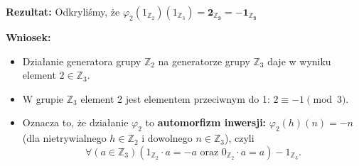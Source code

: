 \begin{goall}
\begin{enumerate}[label=\textbf{Krok \arabic*.}, wide]
\textbf{Rezultat:} Odkryliśmy, że $\varphi_2\left( 1_{\scriptscriptstyle\mathbb{Z}_2} \right)\left( 1_{\scriptscriptstyle\mathbb{Z}_3} \right) = \bm{2_{\scriptscriptstyle\mathbb{Z}_3} = -1_{\scriptscriptstyle\mathbb{Z}_3} } $ 
\end{enumerate}

\textbf{Wniosek:}
\begin{itemize}
	\item Działanie generatora grupy $\mathbb{Z}_2$ na generatorze grupy $\mathbb{Z}_3$ daje w wyniku element $2 \in \mathbb{Z}_3$.
	\item W grupie $\mathbb{Z}_3$ element 2 jest elementem przeciwnym do 1:  $2 \equiv -1 \pmod{3} $.
	\item Oznacza to, że działanie $\varphi_2$ to \textbf{automorfizm inwersji:} $\varphi_2\left( h \right) \left( n \right) = -n$ (dla nietrywialnego $h \in \mathbb{Z}_2$ i dowolnego $n\in \mathbb{Z}_3$), czyli
		\[
		\forall\left(a \in \mathbb{Z}_3\right)\left( 1_{\scriptscriptstyle\mathbb{Z}_2}\cdot a = -a \text{ oraz } 0_{\scriptscriptstyle\mathbb{Z}_2}\cdot a = a \right)  
		-1_{\scriptscriptstyle\mathbb{Z}_3}.\] 
\end{itemize}
\end{goall} 

